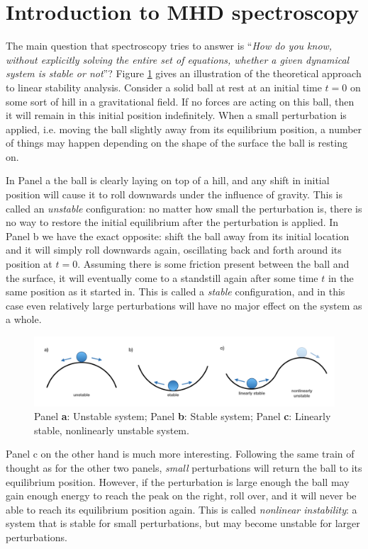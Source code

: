 \section{Introduction to MHD spectroscopy}
The main question that spectroscopy tries to answer is ``\emph{How do you know, without explicitly solving the entire set of equations, whether a given dynamical system is stable or not}''? Figure \ref{fig: stability} gives an illustration of the theoretical approach to linear stability analysis. Consider a solid ball at rest at an initial time $t = 0$ on some sort of hill in a gravitational field. If no forces are acting on this ball, then it will remain in this initial position indefinitely. When a small perturbation is applied, i.e. moving the ball slightly away from its equilibrium position, a number of things may happen depending on the shape of the surface the ball is resting on.

In Panel a the ball is clearly laying on top of a hill, and any shift in initial position will cause it to roll downwards under the influence of gravity. This is called an \emph{unstable} configuration: no matter how small the perturbation is, there is no way to restore the initial equilibrium after the perturbation is applied.
In Panel b we have the exact opposite: shift the ball away from its initial location and it will simply roll downwards again, oscillating back and forth around its position at $t = 0$. Assuming there is some friction present between the ball and the surface, it will eventually come to a standstill again after some time $t$ in the same position as it started in. This is called a \emph{stable} configuration, and in this case even relatively large perturbations will have no major effect on the system as a whole.

\begin{figure}[t]
  \centering
  \includegraphics[width=\textwidth]{stability.png}
  \caption{Panel \textbf{a}: Unstable system; Panel \textbf{b}: Stable system; Panel \textbf{c}: Linearly stable, nonlinearly unstable system.}
  \label{fig: stability}
\end{figure}

Panel c on the other hand is much more interesting. Following the same train of thought as for the other two panels, \emph{small} perturbations will return the ball to its equilibrium position. However, if the perturbation is large enough the ball may gain enough energy to reach the peak on the right, roll over, and it will never be able to reach its equilibrium position again. This is called \emph{nonlinear instability}: a system that is stable for small perturbations, but may become unstable for larger perturbations.

